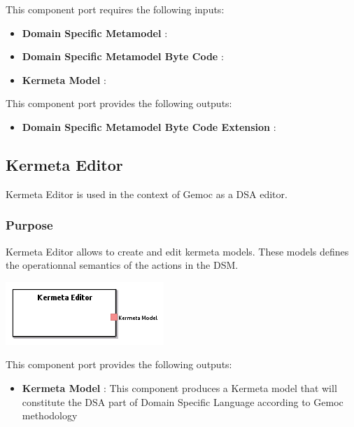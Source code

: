 \documentclass{gemoc} %
\begin{document}
This component port requires the following inputs:
\begin{itemize}
  \item \textbf{Domain Specific Metamodel} :
  \item \textbf{Domain Specific Metamodel Byte Code} :
  \item \textbf{Kermeta Model} :
\end{itemize}

This component port provides the following outputs:
\begin{itemize}
  \item \textbf{Domain Specific Metamodel Byte Code Extension} :
\end{itemize}


\subsection{Kermeta Editor}
Kermeta Editor is used in the context of Gemoc as a DSA editor.

\subsubsection{Purpose}
Kermeta Editor allows to create and edit kermeta models. These models defines the operationnal semantics of the actions in the DSM.

\begin{center}
\includegraphics*[trim=0.0cm 0.0cm 0cm 0.0cm, clip=true]{../images/generated/Generated_Kermeta_Editor.png}
\end{center}


This component port provides the following outputs:
\begin{itemize}
  \item \textbf{Kermeta Model} :
This component produces a Kermeta model that will constitute the DSA part of Domain Specific Language according to Gemoc methodology 
\end{itemize}
\end{document}
